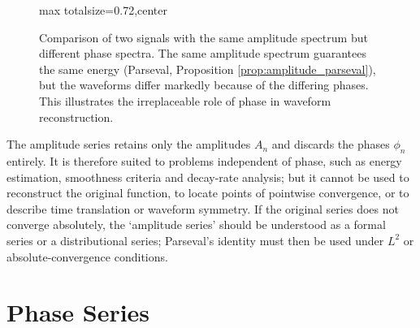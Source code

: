 \begin{figure}[htbp]
\centering
\begin{adjustbox}{max totalsize={\linewidth}{0.72\textheight},center}
\end{adjustbox}
\caption{Comparison of two signals with the same amplitude spectrum but different phase spectra. The same amplitude spectrum guarantees the same energy (Parseval, Proposition \ref{prop:amplitude_parseval}), but the waveforms differ markedly because of the differing phases. This illustrates the irreplaceable role of phase in waveform reconstruction.}
\label{fig:same_amplitude_diff_phase}
\end{figure}

\begin{remark}\label{rem:amplitude_series_scope}
The amplitude series retains only the amplitudes $A_n$ and discards the phases $\phi_n$ entirely. It is therefore suited to problems independent of phase, such as energy estimation, smoothness criteria and decay-rate analysis; but it cannot be used to reconstruct the original function, to locate points of pointwise convergence, or to describe time translation or waveform symmetry. If the original series does not converge absolutely, the `amplitude series' should be understood as a formal series or a distributional series; Parseval's identity must then be used under $L^2$ or absolute-convergence conditions.
\end{remark}

\section{\texorpdfstring{Phase Series}{Phase Series}}

